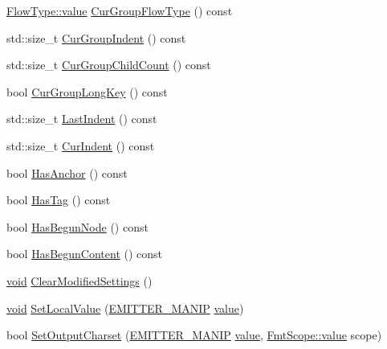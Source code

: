 \begin{DoxyCompactItemize}
\item 
\mbox{\hyperlink{struct_y_a_m_l_1_1_flow_type_afc7b0fab097e599c9b49918739e1b5cc}{Flow\+Type\+::value}} \mbox{\hyperlink{class_y_a_m_l_1_1_emitter_state_aa40ed6d18f1ea70244e8c7d7a6a65ce4}{Cur\+Group\+Flow\+Type}} () const
\item 
std\+::size\+\_\+t \mbox{\hyperlink{class_y_a_m_l_1_1_emitter_state_aebf589d8af74a64d8193dd883ae8c079}{Cur\+Group\+Indent}} () const
\item 
std\+::size\+\_\+t \mbox{\hyperlink{class_y_a_m_l_1_1_emitter_state_ae4ef4ccea608131c01161fd2cf6891e5}{Cur\+Group\+Child\+Count}} () const
\item 
bool \mbox{\hyperlink{class_y_a_m_l_1_1_emitter_state_a9c96c726681159b1866a389a3d8c4fc1}{Cur\+Group\+Long\+Key}} () const
\item 
std\+::size\+\_\+t \mbox{\hyperlink{class_y_a_m_l_1_1_emitter_state_ae2f04931df4f82cdde4785010c7a7823}{Last\+Indent}} () const
\item 
std\+::size\+\_\+t \mbox{\hyperlink{class_y_a_m_l_1_1_emitter_state_a7600248c47211250bbd08af6366f391d}{Cur\+Indent}} () const
\item 
bool \mbox{\hyperlink{class_y_a_m_l_1_1_emitter_state_a14a9aa742edcd9d249cc9b0da79a36a3}{Has\+Anchor}} () const
\item 
bool \mbox{\hyperlink{class_y_a_m_l_1_1_emitter_state_a7b7d743cef490055b4a445f9c0eb1846}{Has\+Tag}} () const
\item 
bool \mbox{\hyperlink{class_y_a_m_l_1_1_emitter_state_ae9f170424ef31253ae8d41a347ae25d4}{Has\+Begun\+Node}} () const
\item 
bool \mbox{\hyperlink{class_y_a_m_l_1_1_emitter_state_a7b49f9ca8371bb1845def9f3aec04a7d}{Has\+Begun\+Content}} () const
\item 
\mbox{\hyperlink{glad_8h_a950fc91edb4504f62f1c577bf4727c29}{void}} \mbox{\hyperlink{class_y_a_m_l_1_1_emitter_state_a695c60b3e3c859c988c214bdd579f875}{Clear\+Modified\+Settings}} ()
\item 
\mbox{\hyperlink{glad_8h_a950fc91edb4504f62f1c577bf4727c29}{void}} \mbox{\hyperlink{class_y_a_m_l_1_1_emitter_state_aaf4b807f7c6f37f3747748dd15a2f62d}{Set\+Local\+Value}} (\mbox{\hyperlink{namespace_y_a_m_l_a67c320aa50d3de7ecba1d0b8775dd684}{E\+M\+I\+T\+T\+E\+R\+\_\+\+M\+A\+N\+IP}} \mbox{\hyperlink{glad_8h_a03aff08f73d7fde3d1a08e0abd8e84fa}{value}})
\item 
bool \mbox{\hyperlink{class_y_a_m_l_1_1_emitter_state_ad86c747b2fd2ac6c1c8c5e0b9cabea01}{Set\+Output\+Charset}} (\mbox{\hyperlink{namespace_y_a_m_l_a67c320aa50d3de7ecba1d0b8775dd684}{E\+M\+I\+T\+T\+E\+R\+\_\+\+M\+A\+N\+IP}} \mbox{\hyperlink{glad_8h_a03aff08f73d7fde3d1a08e0abd8e84fa}{value}}, \mbox{\hyperlink{struct_y_a_m_l_1_1_fmt_scope_a58c967eadfafdc79f62cd5c59ec2b1fe}{Fmt\+Scope\+::value}} scope)

\end{DoxyCompactItemize}
